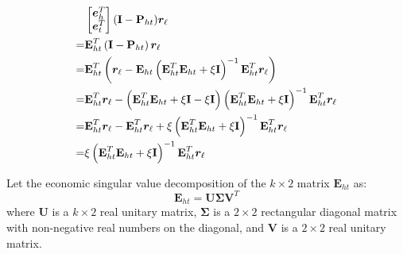 \documentclass[9pt]{sig-alternate-05-2015}
\begin{document}
\begin{align}
 &\begin{bmatrix} \bm{e}_h^{T} \\ \bm{e}_t^{T} \end{bmatrix} (\textbf{I} -  \textbf{P}_{ht})\bm{r}_{\ell} \notag  \\
=&\textbf{E}_{ht}^{T}\left(\textbf{I} -  \textbf{P}_{ht}\right)\bm{r}_{\ell}  \notag \\
=&\textbf{E}_{ht}^{T}\left(\bm{r}_{\ell} -  \textbf{E}_{ht}\left(\textbf{E}_{ht}^{T} \textbf{E}_{ht} + \xi \textbf{I} \right)^{-1} \textbf{E}_{ht}^{T} \bm{r}_{\ell}\right)  \notag \\
=&\textbf{E}_{ht}^{T}\bm{r}_{\ell} - \left (\textbf{E}_{ht}^{T} \textbf{E}_{ht}+\xi \textbf{I} - \xi \textbf{I}\right)\left(\textbf{E}_{ht}^{T} \textbf{E}_{ht} + \xi \textbf{I}\right )^{-1} \textbf{E}_{ht}^{T} \bm{r}_{\ell} \notag \\
=& \textbf{E}_{ht}^{T}\bm{r}_{\ell} - \textbf{E}_{ht}^{T} \bm{r}_{\ell}  +  \xi \left(\textbf{E}_{ht}^{T} \textbf{E}_{ht} + \xi \textbf{I}\right )^{-1} \textbf{E}_{ht}^{T} \bm{r}_{\ell}  \notag \\
=& \xi \left(\textbf{E}_{ht}^{T} \textbf{E}_{ht} + \xi \textbf{I}\right )^{-1} \textbf{E}_{ht}^{T} \bm{r}_{\ell}   \label{temp}
\end{align}

Let the economic singular value decomposition of the $k \times 2$ matrix $\textbf{E}_{ht}$ as:
\begin{equation*}
\textbf{E}_{ht} = \textbf{U} \mathbf{\Sigma} \textbf{V}^{T}
\end{equation*}
where \textbf{U} is a $k \times 2$ real unitary matrix, $\mathbf{\Sigma}$ is a $2 \times 2$ rectangular diagonal matrix with non-negative real numbers on the diagonal, and \textbf{V} is a $2 \times 2$ real unitary matrix.
\end{document}
